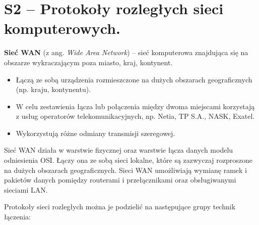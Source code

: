 \section{S2 -- Protokoły rozległych sieci komputerowych.}

\textbf{Sieć WAN} (z ang. \textit{Wide Area Network}) – sieć komputerowa znajdująca się na obszarze wykraczającym poza miasto, kraj, kontynent.

\begin{itemize}
	\setlength\itemsep{1pt}
	\item Łączą ze sobą urządzenia rozmieszczone na dużych obszarach geograficznych (np. kraju, kontynentu).
	\item W celu zestawienia łącza lub połączenia między dwoma miejscami korzystają z usług operatorów telekomunikacyjnych, np. Netia, TP S.A., NASK, Exatel.
	\item Wykorzystują różne odmiany transmisji szeregowej.
\end{itemize}

Sieć WAN działa w warstwie fizycznej oraz warstwie łącza danych modelu odniesienia OSI. Łączy ona ze sobą sieci lokalne, które są zazwyczaj rozproszone na dużych obszarach geograficznych. Sieci WAN umożliwiają wymianę ramek i pakietów danych pomiędzy routerami i przełącznikami oraz obsługiwanymi sieciami LAN.

Protokoły sieci rozległych można je podzielić na następujące grupy technik łączenia:

